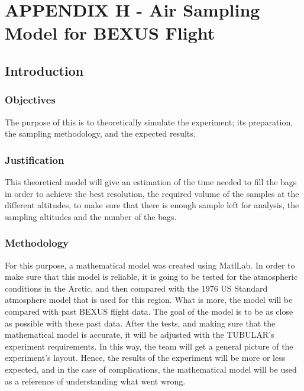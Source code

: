 \section{APPENDIX H - Air Sampling Model for BEXUS Flight}


\subsection{Introduction}


\subsubsection{Objectives}

The purpose of this is to theoretically simulate the experiment; its preparation, the sampling methodology, and the expected results.

\subsubsection{Justification}

This theoretical model will give an estimation of the time needed to fill the bags in order to achieve the best resolution, the required volume of the samples at the different altitudes, to make sure that there is enough sample left for analysis, the sampling altitudes and the number of the bags.  

\subsubsection{Methodology}

For this purpose, a mathematical model was created using MatlLab. In order to make sure that this model is reliable, it is going to be tested for the atmospheric conditions in the Arctic, and then compared with the 1976 US Standard atmosphere model that is used for this region. What is more, the model will be compared with past BEXUS flight data. The goal of the model is to be as close as possible with these past data. 
After the tests, and making sure that the mathematical model is accurate, it will be adjusted with the TUBULAR's experiment requirements. In this way, the team will get a general picture of the experiment's layout. Hence, the results of the experiment will be more or less expected, and in the case of complications, the mathematical model will be used as a reference of understanding what went wrong.


